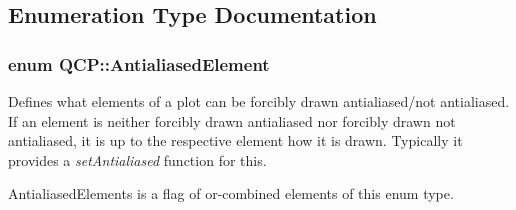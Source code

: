 \subsection{Enumeration Type Documentation}
\hypertarget{namespaceQCP_ae55dbe315d41fe80f29ba88100843a0c}{
\subsubsection[{Antialiased\-Element}]{\setlength{\rightskip}{0pt plus 5cm}enum {\bf Q\-C\-P\-::\-Antialiased\-Element}}}\label{namespaceQCP_ae55dbe315d41fe80f29ba88100843a0c}
Defines what elements of a plot can be forcibly drawn antialiased/not antialiased. If an element is neither forcibly drawn antialiased nor forcibly drawn not antialiased, it is up to the respective element how it is drawn. Typically it provides a {\itshape set\-Antialiased} function for this.

{\ttfamily Antialiased\-Elements} is a flag of or-\/combined elements of this enum type.

